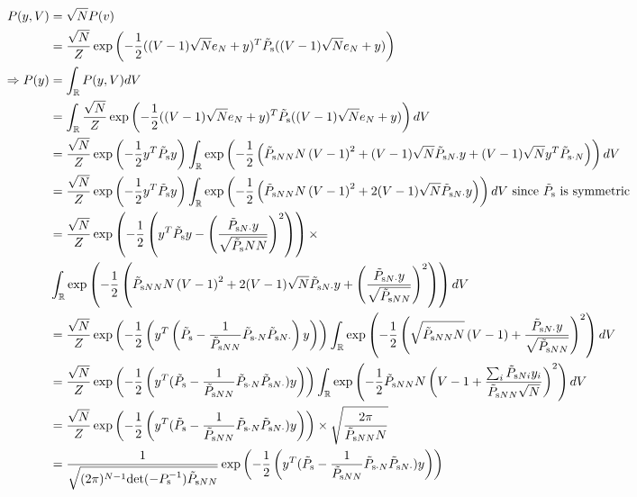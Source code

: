 \documentclass{article}
\begin{document}
\begin{align*}
P(y,V)&=\sqrt{N}P(v)
\\&=\frac{\sqrt{N}}{Z}\exp\left(-\frac{1}{2}((V-1)\sqrt{N}e_N+y)^T\Tilde{P}_\text{s}((V-1)\sqrt{N}e_N+y)\right)
\\ \Rightarrow P(y)&=\int_{\mathbb{R}} P(y,V)dV
\\&=\int_{\mathbb{R}} \frac{\sqrt{N}}{Z}\exp\left(-\frac{1}{2}((V-1)\sqrt{N}e_N+y)^T\Tilde{P}_\text{s}((V-1)\sqrt{N}e_N+y)\right)dV
\\&=\frac{\sqrt{N}}{Z}\exp\left(-\frac{1}{2}y^T\Tilde{P}_\text{s}y\right)\int_{\mathbb{R}} \exp\left(-\frac{1}{2}\left(\Tilde{P}_{\text{s}NN}N\left(V-1\right)^2+(V-1)\sqrt{N}\tilde{P}_{\text{s}N\cdot}y+(V-1)\sqrt{N}y^T\tilde{P}_{\text{s}\cdot N}\right)\right)dV
\\&=\frac{\sqrt{N}}{Z}\exp\left(-\frac{1}{2}y^T\Tilde{P}_\text{s}y\right)\int_{\mathbb{R}} \exp\left(-\frac{1}{2}\left(\Tilde{P}_{\text{s}NN}N\left(V-1\right)^2+2(V-1)\sqrt{N}\tilde{P}_{\text{s}N\cdot}y\right)\right)dV \text{ since $\Tilde{P}_\text{s}$ is symmetric }
\\&=\frac{\sqrt{N}}{Z}\exp\left(-\frac{1}{2}\left(y^T\Tilde{P}_\text{s}y-\left(\frac{\tilde{P}_{\text{s}N\cdot}y}{\sqrt{\tilde{P}_\text{s}NN}}\right)^2\right)\right)\times
\\&\int_{\mathbb{R}} \exp\left(-\frac{1}{2}\left(\Tilde{P}_{\text{s}NN}N\left(V-1\right)^2+2(V-1)\sqrt{N}\tilde{P}_{\text{s}N\cdot}y+\left(\frac{\tilde{P}_{\text{s}N\cdot}y}{\sqrt{\Tilde{P}_{\text{s}NN}}}\right)^2\right)\right)dV 
\\&=\frac{\sqrt{N}}{Z}\exp\left(-\frac{1}{2}\left(y^T\left(\tilde{P}_{\text{s}}-\frac{1}{\tilde{P}_{\text{s}NN}}\tilde{P}_{\text{s}\cdot N}\tilde{P}_{\text{s}N\cdot}\right)y\right)\right)\int_{\mathbb{R}} \exp\left(-\frac{1}{2}\left(\sqrt{\Tilde{P}_{\text{s}NN}N}\left(V-1\right)+\frac{\tilde{P}_{\text{s}N\cdot}y}{\sqrt{\Tilde{P}_{\text{s}NN}}}\right)^2\right)dV
\\&=\frac{\sqrt{N}}{Z}\exp\left(-\frac{1}{2}\left(y^T(\tilde{P}_{\text{s}}-\frac{1}{\tilde{P}_{\text{s}NN}}\tilde{P}_{\text{s}\cdot N}\tilde{P}_{\text{s}N\cdot})y\right)\right)\int_{\mathbb{R}} \exp\left(-\frac{1}{2}\tilde{P}_{\text{s}NN}N\left(V-1+\frac{\sum_i\tilde{P}_{\text{s}Ni}y_i}{\tilde{P}_{\text{s}NN}\sqrt{N}}\right)^2\right)dV
\\&=\frac{\sqrt{N}}{Z}\exp\left(-\frac{1}{2}\left(y^T(\tilde{P}_{\text{s}}-\frac{1}{\tilde{P}_{\text{s}NN}}\tilde{P}_{\text{s}\cdot N}\tilde{P}_{\text{s}N\cdot})y\right)\right)\times\sqrt{\frac{2\pi}{\tilde{P}_{\text{s}NN}N}}
\\&=\frac{1}{\sqrt{(2\pi)^{N-1}\mathrm{det}(-P_\text{s}^{-1})\tilde{P}_{\text{s}NN}}}\exp\left(-\frac{1}{2}\left(y^T(\tilde{P}_{\text{s}}-\frac{1}{\tilde{P}_{\text{s}NN}}\tilde{P}_{\text{s}\cdot N}\tilde{P}_{\text{s}N\cdot })y\right)\right)
\end{align*}
\end{document}
